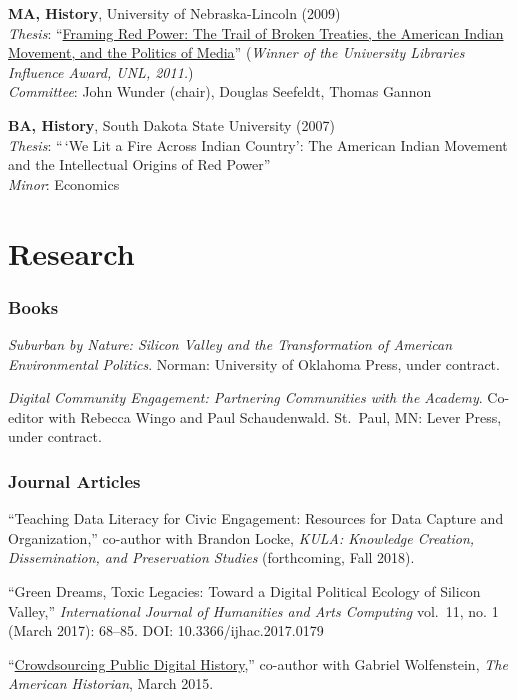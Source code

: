 \textbf{MA, History}, University of Nebraska-Lincoln (2009)\\
\emph{Thesis}:
``\href{http://digitalcommons.unl.edu/historydiss/21/}{Framing Red
Power: The Trail of Broken Treaties, the American Indian Movement, and
the Politics of Media}'' (\emph{Winner of the University Libraries
Influence Award, UNL, 2011.})\\
\emph{Committee}: John Wunder (chair), Douglas Seefeldt, Thomas Gannon

\textbf{BA, History}, South Dakota State University (2007)\\
\emph{Thesis}: ``\,`We Lit a Fire Across Indian Country': The American
Indian Movement and the Intellectual Origins of Red Power''\\
\emph{Minor}: Economics

\section{Research}\label{research}

\subsubsection{Books}\label{books}

\emph{Suburban by Nature: Silicon Valley and the Transformation of
American Environmental Politics}. Norman: University of Oklahoma Press,
under contract.

\emph{Digital Community Engagement: Partnering Communities with the
Academy}. Co-editor with Rebecca Wingo and Paul Schaudenwald. St.~Paul,
MN: Lever Press, under contract.

\subsubsection{Journal Articles}\label{journal-articles}

``Teaching Data Literacy for Civic Engagement: Resources for Data
Capture and Organization,'' co-author with Brandon Locke, \emph{KULA:
Knowledge Creation, Dissemination, and Preservation Studies}
(forthcoming, Fall 2018).

``Green Dreams, Toxic Legacies: Toward a Digital Political Ecology of
Silicon Valley,'' \emph{International Journal of Humanities and Arts
Computing} vol.~11, no. 1 (March 2017): 68--85. DOI:
10.3366/ijhac.2017.0179

``\href{http://tah.oah.org/content/crowdsourcing-digital-public-history/}{Crowdsourcing
Public Digital History},'' co-author with Gabriel Wolfenstein, \emph{The
American Historian}, March 2015.

